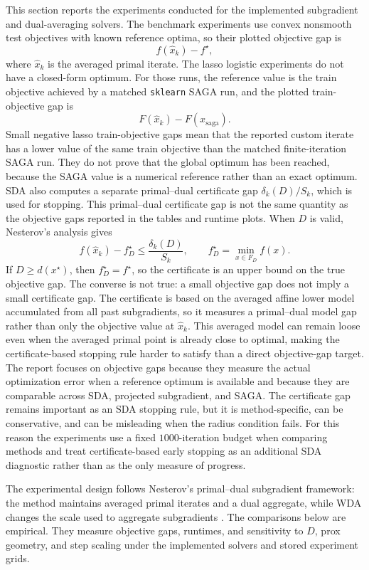 \documentclass[11pt]{article}
\begin{document}
This section reports the experiments conducted for the implemented subgradient and
dual-averaging solvers.  The benchmark experiments use convex nonsmooth test
objectives with known reference optima, so their plotted objective gap is
\[
    f(\hat x_k)-f^\star ,
\]
where \(\hat x_k\) is the averaged primal iterate.  The lasso logistic
experiments do not have a closed-form optimum.  For those runs, the reference
value is the train objective achieved by a matched \texttt{sklearn} SAGA run,
and the plotted train-objective gap is
\[
    F(\hat x_k)-F(x_{\mathrm{saga}}).
\]
Small negative lasso train-objective gaps mean that the reported custom iterate
has a lower value of the same train objective than the matched finite-iteration
SAGA run.  They do not prove that the global optimum has been reached, because
the SAGA value is a numerical reference rather than an exact optimum.  SDA also
computes a separate primal--dual certificate gap
\(\delta_k(D)/S_k\), which is used for stopping.  This primal--dual certificate
gap is not the same quantity as the objective gaps reported in the tables and
runtime plots.  When \(D\) is valid, Nesterov's analysis gives
\[
    f(\hat x_k)-f_D^\star \le \frac{\delta_k(D)}{S_k},
    \qquad
    f_D^\star=\min_{x\in F_D} f(x).
\]
If \(D\ge d(x^\star)\), then \(f_D^\star=f^\star\), so the certificate is an
upper bound on the true objective gap.  The converse is not true: a small
objective gap does not imply a small certificate gap.  The certificate is based
on the averaged affine lower model accumulated from all past subgradients, so it
measures a primal--dual model gap rather than only the objective value at
\(\hat x_k\).  This averaged model can remain loose even when the averaged
primal point is already close to optimal, making the certificate-based stopping
rule harder to satisfy than a direct objective-gap target.  The report focuses
on objective gaps because they measure the actual optimization error when a
reference optimum is available and because they are comparable across SDA,
projected subgradient, and SAGA.  The certificate gap remains important as an
SDA stopping rule, but it is method-specific, can be conservative, and can be
misleading when the radius condition fails.  For this reason the experiments use
a fixed \(1000\)-iteration budget when comparing methods and treat
certificate-based early stopping as an additional SDA diagnostic rather than as
the only measure of progress.

The experimental design follows Nesterov's primal--dual subgradient framework:
the method maintains averaged primal iterates and a dual aggregate, while WDA
changes the scale used to aggregate subgradients
\cite{nesterov_primal_dual}.  The comparisons below are empirical.  They
measure objective gaps, runtimes, and sensitivity to \(D\), prox geometry, and
step scaling under the implemented solvers and stored experiment grids.
\end{document}

